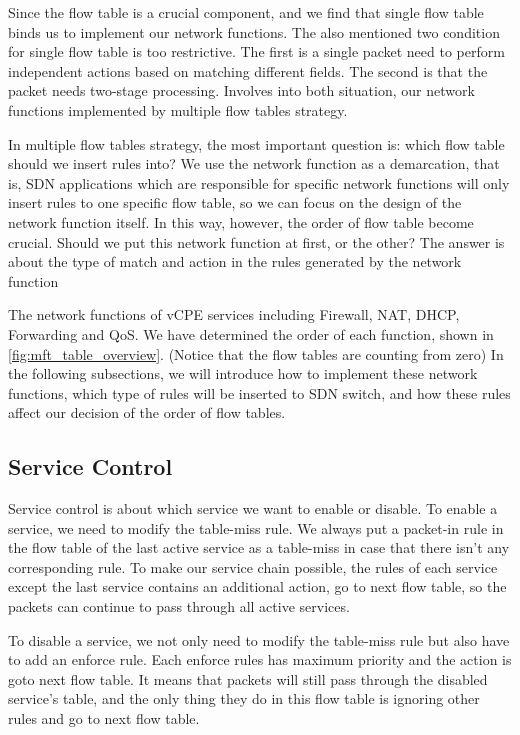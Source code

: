 \documentclass[journal]{IEEEtran}
\begin{document}
Since the flow table is a crucial component, and we find that single flow table binds us to implement our network functions. The \cite{onf-multi-tables} also mentioned two condition for single flow table is too restrictive. The first is a single packet need to perform independent actions based on matching different fields. The second is that the packet needs two-stage processing. Involves into both situation, our network functions implemented by multiple flow tables strategy.

In multiple flow tables strategy, the most important question is: which flow table should we insert rules into? We use the network function as a demarcation, that is, SDN applications which are responsible for specific network functions will only insert rules to one specific flow table, so we can focus on the design of the network function itself. In this way, however, the order of flow table become crucial. Should we put this network function at first, or the other? The answer is about the type of match and action in the rules generated by the network function

The network functions of vCPE services including Firewall, NAT, DHCP, Forwarding and QoS. We have determined the order of each function, shown in \ref{fig:mft_table_overview}. (Notice that the flow tables are counting from zero) In the following subsections, we will introduce how to implement these network functions, which type of rules will be inserted to SDN switch, and how these rules affect our decision of the order of flow tables.



\subsection{Service Control}
Service control is about which service we want to enable or disable. To enable a service, we need to modify the table-miss rule. We always put a packet-in rule in the flow table of the last active service as a table-miss in case that there isn't any corresponding rule. To make our service chain possible, the rules of each service except the last service contains an additional action, go to next flow table, so the packets can continue to pass through all active services.

To disable a service, we not only need to modify the table-miss rule but also have to add an enforce rule. Each enforce rules has maximum priority and the action is goto next flow table. It means that packets will still pass through the disabled service's table, and the only thing they do in this flow table is ignoring other rules and go to next flow table.
\end{document}

